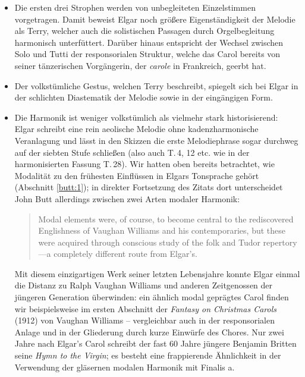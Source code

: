 \documentclass[a4paper,11pt,open=any]{scrbook}
\newcommand{\engquote}[1]{\foreignblockquote{english}{#1}}
\begin{document}
\begin{itemize}
 \item Die ersten drei Strophen werden von unbegleiteten Einzelstimmen
 vorgetragen.  Damit beweist Elgar noch größere Eigenständigkeit der
 Melodie als Terry, welcher auch die solistischen Passagen durch
 Orgelbegleitung harmonisch unterfüttert.  Darüber hinaus entspricht
 der Wechsel zwischen Solo und Tutti der responsorialen Struktur, welche
 das Carol bereits von seiner tänzerischen Vorgängerin, der \textit{carole}
 in Frankreich, geerbt hat.

 \item Der volkstümliche Gestus, welchen Terry beschreibt, spiegelt sich bei
 Elgar in der schlichten Diastematik der Melodie sowie in der eingängigen
 Form.

 \item Die Harmonik ist weniger volkstümlich als vielmehr stark
 historisierend: Elgar schreibt eine rein aeolische Melodie ohne
 kadenzharmonische Veranlagung und lässt in den Skizzen die erste
 Melodiephrase sogar durchweg auf der siebten Stufe schließen (also auch
 T.\,4, 12 etc. wie in der harmonisierten Fassung T.\,28). Wir hatten oben
 bereits betrachtet, wie Modalität zu den frühesten Einflüssen in Elgars
 Tonsprache gehört (Abschnitt \vref{butt:1}); in direkter Fortsetzung des Zitats dort
 unterscheidet John Butt allerdings zwischen zwei Arten modaler Harmonik:
 \engquote{Modal elements were, of course, to become central to the
 rediscovered Englishness of Vaughan Williams and his contemporaries,
 but these were acquired through conscious study of the folk and Tudor
 repertory—a completely different route from Elgar’s.}
 Mit diesem einzigartigen Werk seiner letzten Lebensjahre konnte Elgar
 einmal die Distanz zu Ralph Vaughan Williams und anderen Zeitgenossen
 der jüngeren Generation überwinden: ein ähnlich modal geprägtes Carol
 finden wir beispielsweise im ersten Abschnitt der \textit{Fantasy on
 Christmas Carols} (1912) von Vaughan Williams\cite{vaughan-williams} –
 vergleichbar auch in der responsorialen Anlage und in der Gliederung
 durch kurze Einwürfe des Chores.  Nur zwei Jahre nach Elgar’s Carol
 schreibt der fast 60 Jahre jüngere Benjamin Britten seine \textit{Hymn
 to the Virgin}; es besteht eine frappierende Ähnlichkeit in der
 Verwendung der gläsernen modalen Harmonik mit Finalis a.


\end{itemize}
\end{document}
